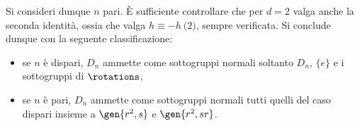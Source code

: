 \documentclass[12pt]{scrartcl}
\begin{document}
	
	Si consideri dunque $n$ pari. È sufficiente controllare che per $d = 2$ valga
	anche la seconda identità, ossia che valga $h \equiv -h \pod 2$, sempre verificata.
	Si conclude dunque con la seguente classificazione:
	
	\begin{itemize}
		\item se $n$ è dispari, $D_n$ ammette come sottogruppi normali soltanto
		$D_n$, $\{ e \}$ e i sottogruppi di $\rotations$,
		\item se $n$ è pari, $D_n$ ammette come sottogruppi normali tutti quelli
			del caso dispari insieme a $\gen{r^2, s}$ e $\gen{r^2, s r}$.
	\end{itemize}
\end{document}

